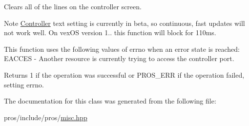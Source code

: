 Clears all of the lines on the controller screen. 

\begin{DoxyNote}{Note}
\hyperlink{classpros_1_1Controller}{Controller} text setting is currently in beta, so continuous, fast updates will not work well. On vex\+OS version 1.. this function will block for 110ms.
\end{DoxyNote}
This function uses the following values of errno when an error state is reached\+: E\+A\+C\+C\+ES -\/ Another resource is currently trying to access the controller port.

\begin{DoxyReturn}{Returns}
1 if the operation was successful or P\+R\+O\+S\+\_\+\+E\+RR if the operation failed, setting errno. 
\end{DoxyReturn}


The documentation for this class was generated from the following file\+:\begin{DoxyCompactItemize}
\item 
pros/include/pros/\hyperlink{misc_8hpp}{misc.\+hpp}\end{DoxyCompactItemize}
